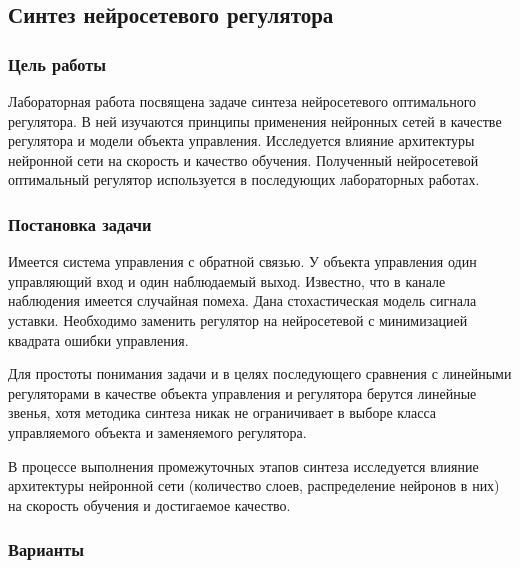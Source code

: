 
\subsection{Синтез нейросетевого регулятора}

\subsubsection{Цель работы}

Лабораторная работа посвящена задаче синтеза нейросетевого
оптимального регулятора.  В ней изучаются принципы применения
нейронных сетей в качестве регулятора и модели объекта управления.
Исследуется влияние архитектуры нейронной сети на скорость и качество
обучения.  Полученный нейросетевой оптимальный регулятор используется
в последующих лабораторных работах.

\subsubsection{Постановка задачи}

Имеется система управления с обратной связью.  У объекта управления
один управляющий вход и один наблюдаемый выход.  Известно, что в
канале наблюдения имеется случайная помеха.  Дана стохастическая
модель сигнала уставки.  Необходимо заменить регулятор на нейросетевой
с минимизацией квадрата ошибки управления.

Для простоты понимания задачи и в целях последующего сравнения с
линейными регуляторами в качестве объекта управления и регулятора
берутся линейные звенья, хотя методика синтеза никак не ограничивает в
выборе класса управляемого объекта и заменяемого регулятора.

В процессе выполнения промежуточных этапов синтеза исследуется влияние
архитектуры нейронной сети (количество слоев, распределение нейронов в
них) на скорость обучения и достигаемое качество.

\subsubsection{Варианты}

